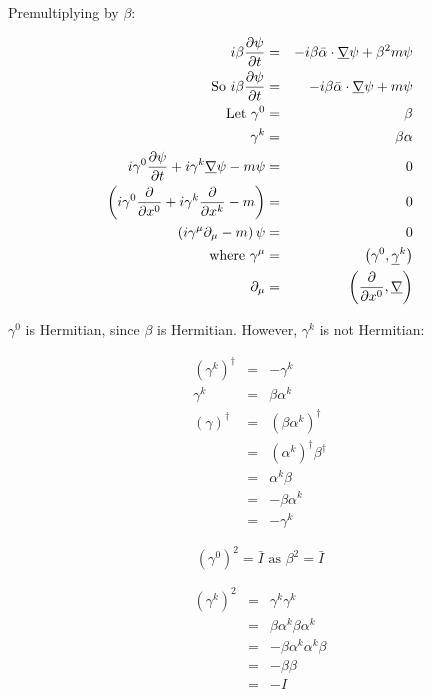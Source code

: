 Premultiplying by $\beta$:

\begin{eqnarray*}
  i\beta \frac{\partial \psi}{\partial t} & = & -i\beta\bar{\alpha}\cdot\underline{\nabla}\psi + \beta^2 m \psi \\
  \textrm{So } i\beta\frac{\partial \psi}{\partial t} & = & -i\beta\bar{\alpha}\cdot\underline{\nabla}\psi + m\psi \\
  \textrm{Let } \gamma^0 & = & \beta \\
  \gamma^k & = & \beta\alpha \\
  i\gamma^0 \frac{\partial \psi}{\partial t} + i\gamma^k \underline{\nabla}\psi - m\psi & = & 0 \\
  \left( i\gamma^0 \frac{\partial}{\partial x^0} + i\gamma^k\frac{\partial}{\partial x^k} - m\right) & = & 0 \\
  \left( i\gamma^{\mu}\partial_{\mu} - m \right)\psi & = & 0 \\
  \textrm{where } \gamma^{\mu} & = & \left( \gamma^0,\underline{\gamma}^k\right) \\
  \partial_{\mu} & = & \left( \frac{\partial}{\partial x^0},\underline{\nabla}\right)
\end{eqnarray*}

$\gamma^0$ is Hermitian, since $\beta$ is Hermitian.  However, $\gamma^k$ is not Hermitian:

\begin{eqnarray*}
  \left(\gamma^k\right)^{\dagger} & = & -\gamma^k \\
  \gamma^k & = & \beta\alpha^k \\
  \left(\gamma\right)^{\dagger} & = & \left(\beta \alpha^k \right)^{\dagger} \\
  & = & \left(\alpha^k\right)^{\dagger}\beta^{\dagger} \\
  & = & \alpha^k\beta \\
  & = & -\beta\alpha^k \\
  & = & -\gamma^k
\end{eqnarray*}

\[
  \left(\gamma^0\right)^2 = \bar{I} \textrm{ as } \beta^2 = \bar{I}
\]

\begin{eqnarray*}
  \left(\gamma^k\right)^2 & = & \gamma^k\gamma^k \\
  & = & \beta\alpha^k\beta\alpha^k \\
  & = & -\beta\alpha^k\alpha^k\beta \\
  & = & -\beta\beta \\
  & = & -I
\end{eqnarray*}

